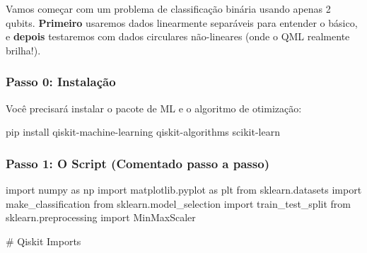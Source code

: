 \documentclass[
  brazilian,
]{report}
\newenvironment{Shaded}{\begin{snugshade}}{\end{snugshade}}
\newcommand{\ExtensionTok}[1]{\textcolor[rgb]{0.00,0.23,0.31}{#1}}
\newcommand{\NormalTok}[1]{\textcolor[rgb]{0.00,0.23,0.31}{#1}}
\begin{document}
Vamos começar com um problema de classificação binária usando apenas 2
qubits. \textbf{Primeiro} usaremos dados linearmente separáveis para
entender o básico, e \textbf{depois} testaremos com dados circulares
não-lineares (onde o QML realmente brilha!).

\subsubsection{Passo 0: Instalação}\label{passo-0-instalauxe7uxe3o}

Você precisará instalar o pacote de ML e o algoritmo de otimização:

\begin{Shaded}
\begin{Highlighting}[]
\ExtensionTok{pip}\NormalTok{ install qiskit{-}machine{-}learning qiskit{-}algorithms scikit{-}learn}
\end{Highlighting}
\end{Shaded}

\subsubsection{Passo 1: O Script (Comentado passo a
passo)}\label{passo-1-o-script-comentado-passo-a-passo}

\begin{Shaded}
\begin{Highlighting}[]
\NormalTok{import numpy as np}
\NormalTok{import matplotlib.pyplot as plt}
\NormalTok{from sklearn.datasets import make\_classification}
\NormalTok{from sklearn.model\_selection import train\_test\_split}
\NormalTok{from sklearn.preprocessing import MinMaxScaler}

\NormalTok{\# Qiskit Imports}
\end{Highlighting}
\end{Shaded}
\end{document}
